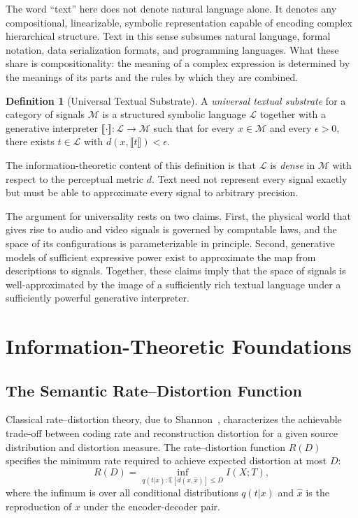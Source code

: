 \documentclass[12pt,a4paper]{article}
\theoremstyle{definition}
\newtheorem{definition}[theorem]{Definition}
\theoremstyle{remark}
\begin{document}
The word ``text'' here does not denote natural language alone. It denotes any compositional, linearizable, symbolic representation capable of encoding complex hierarchical structure. Text in this sense subsumes natural language, formal notation, data serialization formats, and programming languages. What these share is compositionality: the meaning of a complex expression is determined by the meanings of its parts and the rules by which they are combined.

\begin{definition}[Universal Textual Substrate]
A \emph{universal textual substrate} for a category of signals $\mathcal{M}$ is a structured symbolic language $\mathcal{L}$ together with a generative interpreter $\llbracket \cdot \rrbracket : \mathcal{L} \rightarrow \mathcal{M}$ such that for every $x \in \mathcal{M}$ and every $\epsilon > 0$, there exists $t \in \mathcal{L}$ with $d(x, \llbracket t \rrbracket) < \epsilon$.
\end{definition}

The information-theoretic content of this definition is that $\mathcal{L}$ is \emph{dense} in $\mathcal{M}$ with respect to the perceptual metric $d$. Text need not represent every signal exactly but must be able to approximate every signal to arbitrary precision.

The argument for universality rests on two claims. First, the physical world that gives rise to audio and video signals is governed by computable laws, and the space of its configurations is parameterizable in principle. Second, generative models of sufficient expressive power exist to approximate the map from descriptions to signals. Together, these claims imply that the space of signals is well-approximated by the image of a sufficiently rich textual language under a sufficiently powerful generative interpreter.

\section{Information-Theoretic Foundations}
\label{sec:infotheory}

\subsection{The Semantic Rate--Distortion Function}

Classical rate--distortion theory, due to Shannon~\cite{shannon1948}, characterizes the achievable trade-off between coding rate and reconstruction distortion for a given source distribution and distortion measure. The rate--distortion function $R(D)$ specifies the minimum rate required to achieve expected distortion at most $D$:
\[
R(D) = \inf_{q(t|x) : \mathbb{E}[d(x,\hat{x})] \le D} I(X; T),
\]
where the infimum is over all conditional distributions $q(t|x)$ and $\hat{x}$ is the reproduction of $x$ under the encoder-decoder pair.
\end{document}

